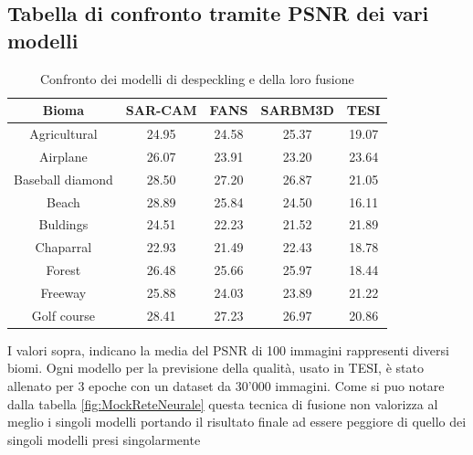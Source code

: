 \subsection{Tabella di confronto tramite PSNR dei vari modelli  }
\begin{table}[H] %
    \centering
    \begin{tabular}{|c|c|c|c|c|}
    \hline
    Bioma & SAR-CAM & FANS & SARBM3D & TESI \\ \hline
    Agricultural &  24.95  & 24.58  & 25.37 & 19.07  \\ \hline
    Airplane & 26.07 & 23.91 & 23.20 & 23.64 \\ \hline
    Baseball diamond & 28.50 & 27.20 & 26.87 &  21.05\\ \hline
    Beach & 28.89 & 25.84 & 24.50 & 16.11 \\ \hline
    Buldings & 24.51 & 22.23 & 21.52 & 21.89 \\ \hline
    Chaparral & 22.93 & 21.49 & 22.43 & 18.78 \\ \hline
    Forest & 26.48 & 25.66 & 25.97 & 18.44 \\ \hline
    Freeway & 25.88 & 24.03 &  23.89 & 21.22 \\ \hline
    Golf course& 28.41 & 27.23 & 26.97 & 20.86 \\ \hline
    \end{tabular}
    \caption{Confronto dei modelli di despeckling e della loro fusione}
    \label{tab:esempio}
    \end{table}
    I valori sopra, indicano la media del PSNR di 100 immagini rappresenti diversi biomi.
    Ogni modello per la previsione della qualità, usato in TESI, 
    è stato allenato per 3 epoche con un dataset da 30'000 
    immagini. Come si puo notare dalla tabella \ref{fig:MockReteNeurale} 
    questa tecnica di fusione non valorizza al meglio i singoli modelli 
    portando il risultato finale ad essere peggiore di quello dei 
    singoli modelli presi singolarmente
    



